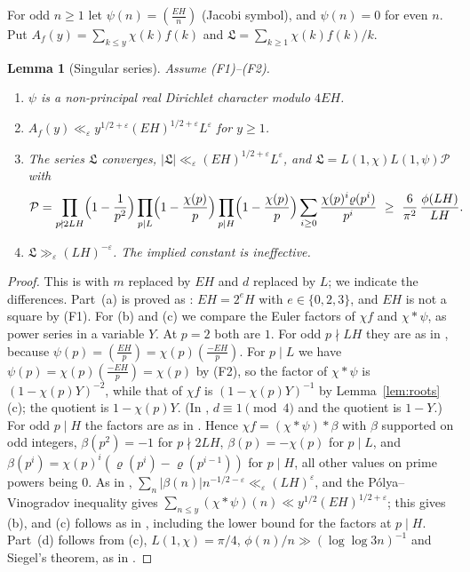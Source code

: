\documentclass[11pt]{amsart}
\newtheorem{lemma}[theorem]{Lemma}
\theoremstyle{remark}
\theoremstyle{definition}
\numberwithin{equation}{section}
\newcommand{\eps}{\varepsilon}
\newcommand{\Lf}{\mathfrak{L}}
\newcommand{\Pf}{\mathcal{P}}
\newcommand{\leg}[2]{\left(\frac{#1}{#2}\right)}
\begin{document}
For odd $n\ge1$ let $\psi(n)=\leg{EH}n$ (Jacobi symbol), and $\psi(n)=0$ for even $n$. Put $A_f(y)=\sum_{k\le y}\chi(k)f(k)$ and $\Lf=\sum_{k\ge1}\chi(k)f(k)/k$.

\begin{lemma}[Singular series]\label{lem:L}
Assume \textup{(F1)}--\textup{(F2)}.
\begin{enumerate}
\item[(a)] $\psi$ is a non-principal real Dirichlet character modulo $4EH$.
\item[(b)] $A_f(y)\ll_\eps y^{1/2+\eps}(EH)^{1/2+\eps}L^{\eps}$ for $y\ge1$.
\item[(c)] The series $\Lf$ converges, $|\Lf|\ll_\eps(EH)^{1/2+\eps}L^\eps$, and $\Lf=L(1,\chi)L(1,\psi)\Pf$ with
\[
\Pf=\prod_{p\nmid2LH}\Bigl(1-\frac1{p^2}\Bigr)\prod_{p\mid L}\Bigl(1-\frac{\chi(p)}p\Bigr)\prod_{p\mid H}\Bigl(1-\frac{\chi(p)}p\Bigr)\sum_{i\ge0}\frac{\chi(p)^i\varrho(p^i)}{p^i}\ \ge\ \frac6{\pi^2}\,\frac{\phi(LH)}{LH}.
\]
\item[(d)] $\Lf\gg_\eps(LH)^{-\eps}$. The implied constant is ineffective.
\end{enumerate}
\end{lemma}

\begin{proof}
This is \cite[Lemma~5.3]{IC} with $m$ replaced by $EH$ and $d$ replaced by $L$; we indicate the differences. Part~(a) is proved as \cite[Lemma~5.3(a)]{IC}: $EH=2^{e}H$ with $e\in\{0,2,3\}$, and $EH$ is not a square by (F1). For (b) and (c) we compare the Euler factors of $\chi f$ and $\chi*\psi$, as power series in a variable $Y$. At $p=2$ both are $1$. For odd $p\nmid LH$ they are as in \cite{IC}, because $\psi(p)=\leg{EH}p=\chi(p)\leg{-EH}p$. For $p\mid L$ we have $\psi(p)=\chi(p)\leg{-EH}p=\chi(p)$ by (F2), so the factor of $\chi*\psi$ is $(1-\chi(p)Y)^{-2}$, while that of $\chi f$ is $(1-\chi(p)Y)^{-1}$ by Lemma~\ref{lem:roots}(c); the quotient is $1-\chi(p)Y$. (In \cite{IC}, $d\equiv1\pmod4$ and the quotient is $1-Y$.) For odd $p\mid H$ the factors are as in \cite{IC}. Hence $\chi f=(\chi*\psi)*\beta$ with $\beta$ supported on odd integers, $\beta(p^2)=-1$ for $p\nmid2LH$, $\beta(p)=-\chi(p)$ for $p\mid L$, and $\beta(p^i)=\chi(p)^i(\varrho(p^i)-\varrho(p^{i-1}))$ for $p\mid H$, all other values on prime powers being $0$. As in \cite{IC}, $\sum_n|\beta(n)|n^{-1/2-\eps}\ll_\eps(LH)^\eps$, and the P\'olya--Vinogradov inequality gives $\sum_{n\le y}(\chi*\psi)(n)\ll y^{1/2}(EH)^{1/2+\eps}$; this gives (b), and (c) follows as in \cite{IC}, including the lower bound for the factors at $p\mid H$. Part~(d) follows from (c), $L(1,\chi)=\pi/4$, $\phi(n)/n\gg(\log\log3n)^{-1}$ and Siegel's theorem, as in \cite[Lemma~5.3(d)]{IC}.
\end{proof}
\end{document}
